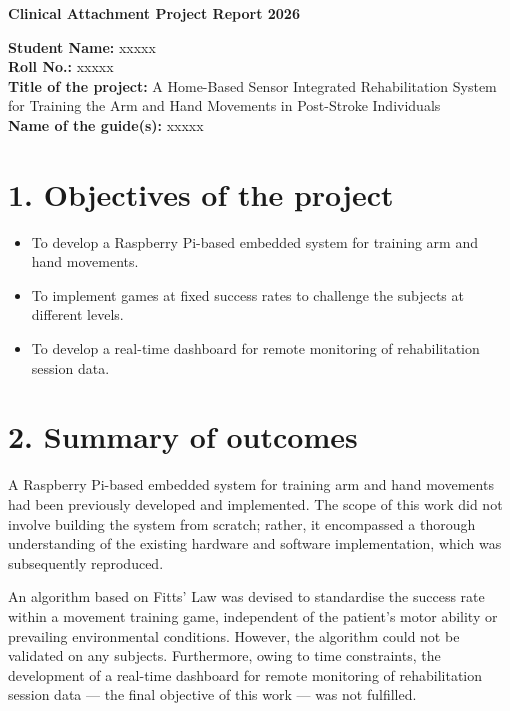 \documentclass[11pt,a4paper]{article}
\begin{document}
\begin{center}
\Large\textbf{Clinical Attachment Project Report 2026}
\end{center}

\vspace{0.5em}

\textbf{Student Name:} xxxxx \\
\textbf{Roll No.:} xxxxx \\
\textbf{Title of the project:} A Home-Based Sensor Integrated Rehabilitation System for Training the Arm and Hand Movements in Post-Stroke Individuals \\
\textbf{Name of the guide(s):} xxxxx

\vspace{1.5em}

\section*{1. Objectives of the project}
\begin{itemize}
    \item To develop a Raspberry Pi-based embedded system for training arm and hand movements.
    \item To implement games at fixed success rates to challenge the subjects at different levels.
    \item To develop a real-time dashboard for remote monitoring of rehabilitation session data.
\end{itemize}

\section*{2. Summary of outcomes}

A Raspberry Pi-based embedded system for training arm and hand movements had been previously developed and implemented. The scope of this work did not involve building the system from scratch; rather, it encompassed a thorough understanding of the existing hardware and software implementation, which was subsequently reproduced.

An algorithm based on Fitts' Law was devised to standardise the success rate within a movement training game, independent of the patient's motor ability or prevailing environmental conditions. However, the algorithm could not be validated on any subjects. Furthermore, owing to time constraints, the development of a real-time dashboard for remote monitoring of rehabilitation session data --- the final objective of this work --- was not fulfilled.
\end{document}
